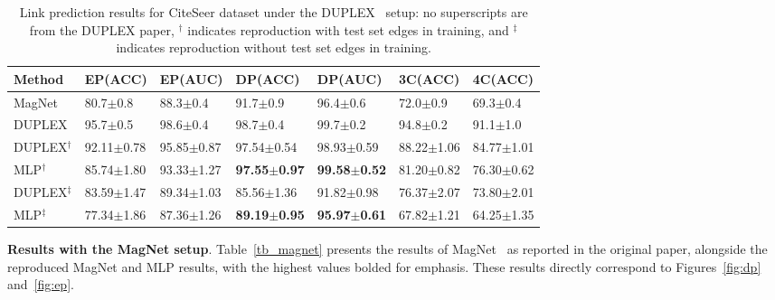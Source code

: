 

\begin{table}[h]
\centering
\caption{Link prediction results for CiteSeer dataset under the DUPLEX~\cite{duplex} setup: no superscripts are from the DUPLEX paper, $^\dagger$ indicates reproduction with test set edges in training, and $^\ddagger$ indicates reproduction without test set edges in training.}
\begin{tabular}{@{}lllllll@{}}
\toprule

Method &EP(ACC) &EP(AUC) &DP(ACC) &DP(AUC) &3C(ACC) &4C(ACC) \\ \midrule

MagNet &80.7$\pm$0.8 &88.3$\pm$0.4 &91.7$\pm$0.9 &96.4$\pm$0.6 &72.0$\pm$0.9 &69.3$\pm$0.4 \\ 
DUPLEX &95.7$\pm$0.5 &98.6$\pm$0.4 &98.7$\pm$0.4 &99.7$\pm$0.2 &94.8$\pm$0.2 &91.1$\pm$1.0  \\ \midrule

DUPLEX$^\dagger$ &92.11$\pm$0.78 &95.85$\pm$0.87 &97.54$\pm$0.54 &98.93$\pm$0.59  &88.22$\pm$1.06 &84.77$\pm$1.01 \\
MLP$^\dagger$ &85.74$\pm$1.80	&93.33$\pm$1.27	&\textbf{97.55$\pm$0.97}	&\textbf{99.58$\pm$0.52}	&81.20$\pm$0.82	&76.30$\pm$0.62  \\ \midrule 

DUPLEX$^\ddagger$  &83.59$\pm$1.47 &89.34$\pm$1.03 &85.56$\pm$1.36 &91.82$\pm$0.98 &76.37$\pm$2.07 &73.80$\pm$2.01 \\
MLP$^\ddagger$ &77.34$\pm$1.86	&87.36$\pm$1.26	&\textbf{89.19$\pm$0.95}	&\textbf{95.97$\pm$0.61}	&67.82$\pm$1.21	&64.25$\pm$1.35 \\ \bottomrule

\end{tabular}
\label{tb:app_duplex}
\end{table}




\textbf{Results with the MagNet setup}. Table~\ref{tb_magnet} presents the results of MagNet~\cite{magnet} as reported in the original paper, alongside the reproduced MagNet and MLP results, with the highest values bolded for emphasis. These results directly correspond to Figures~\ref{fig:dp} and~\ref{fig:ep}.



